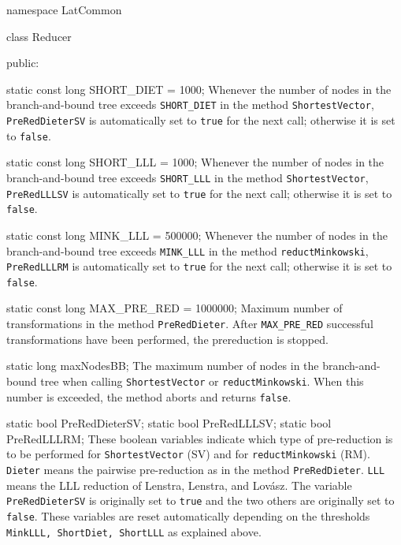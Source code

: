 namespace LatCommon {

class Reducer {
public:

   static const long SHORT_DIET = 1000;
\endcode
\tabb
   Whenever the number of nodes in the branch-and-bound tree exceeds
  \texttt{SHORT\_DIET} in the method \texttt{ShortestVector},
   \texttt{PreRedDieterSV}
   is automatically set to \texttt{true} for the next call;
   otherwise it is set to \texttt{false}.
\endtabb
\code

   static const long SHORT_LLL = 1000;
\endcode
\tabb
   Whenever the number of nodes in the branch-and-bound tree exceeds
   \texttt{SHORT\_LLL} in the  method \texttt{ShortestVector},
   \texttt{PreRedLLLSV} is automatically set to \texttt{true} for the next call;
   otherwise it is set to \texttt{false}.
\endtabb
\code

   static const long MINK_LLL = 500000;
\endcode
\tabb
   Whenever the number of nodes in the branch-and-bound tree exceeds
  \texttt{MINK\_LLL} in the  method \texttt{reduct\-Minkowski},
   \texttt{PreRedLLLRM} is automatically set to \texttt{true} for the
   next call; otherwise it is set to \texttt{false}.
\endtabb
\code

   static const long MAX_PRE_RED = 1000000;
\endcode
\tabb
   Maximum number of transformations in the method \texttt{PreRedDieter}.
   After \texttt{MAX\_PRE\_RED} successful transformations have been performed,
   the prereduction is stopped.
\endtabb
\code

   static long maxNodesBB;
\endcode
\tabb
   The maximum number of nodes %
   in the branch-and-bound tree when calling \texttt{ShortestVector}
   or \texttt{reductMinkowski}.  When this number is exceeded, the method
   aborts and returns \texttt{false}.
\endtabb
\code

   static bool PreRedDieterSV;
   static bool PreRedLLLSV;
   static bool PreRedLLLRM;
\endcode
\tabb
These boolean variables indicate which type of pre-reduction
   is to be performed for \texttt{ShortestVector} (SV) and for
   \texttt{reductMinkowski} (RM).
   \texttt{Dieter} means the pairwise pre-reduction as in the method
   \texttt{PreRedDieter}.
   \texttt{LLL} means the LLL reduction of Lenstra, Lenstra, and Lov\'asz.
   The variable \texttt{PreRedDieterSV} is originally set to \texttt{true}
   and the two others are originally set to \texttt{false}.
   These variables are reset automatically depending on the thresholds
   \texttt{MinkLLL, ShortDiet, ShortLLL} as explained above.
\endtabb
\code

}}
